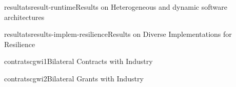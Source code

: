 \documentclass{ra2018}
\begin{document}
\begin{module}{resultats}{result-runtime}{Results on Heterogeneous and dynamic software architectures}
	\label{sec:results-runtime}
	
\end{module}

\begin{module}{resultats}{results-implem-resilience}{Results on Diverse
		Implementations for Resilience}
	\label{sec:results-implem}
	
\end{module}






\begin{module}{contrats}{cgwi1}{Bilateral Contracts with Industry}
\end{module}

\begin{module}{contrats}{cgwi2}{Bilateral Grants with Industry}
\end{module}
\end{document}
